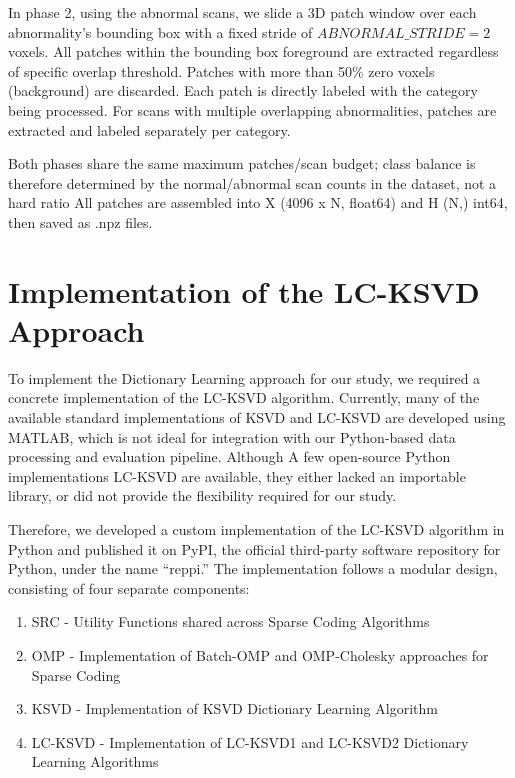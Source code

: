 In phase 2, using the abnormal scans, we slide a 3D patch window over each abnormality's bounding box with a fixed stride of 
\(ABNORMAL\_STRIDE = 2\) voxels. All patches within the bounding box foreground are extracted regardless of specific overlap 
threshold. Patches with more than 50\% zero voxels (background) are discarded. Each patch is directly labeled with the category 
being processed. For scans with multiple overlapping abnormalities, patches are extracted and labeled separately per category.

Both phases share the same maximum patches/scan budget; class balance is therefore determined by the normal/abnormal scan counts in the dataset, not a hard ratio
All patches are assembled into X (4096 x N, float64) and H (N,) int64, then saved as .npz files.


\section{Implementation of the LC-KSVD Approach}
To implement the Dictionary Learning approach for our study, we required a concrete implementation of the LC-KSVD algorithm. \cite{jiang2013lcksvd}
Currently, many of the available standard implementations of KSVD and LC-KSVD are developed using MATLAB, which is not ideal
for integration with our Python-based data processing and evaluation pipeline. Although A few open-source Python implementations
LC-KSVD are available, they either lacked an importable library, or did not provide the flexibility required for our study.

Therefore, we developed a custom implementation of the LC-KSVD algorithm in Python and published it on PyPI,
the official third-party software repository for Python, under the name “reppi.”
The implementation follows a modular design, consisting of four separate components:
\begin{enumerate}
    \item SRC - Utility Functions shared across Sparse Coding Algorithms
    \item OMP - Implementation of Batch-OMP and OMP-Cholesky approaches for Sparse Coding
    \item KSVD - Implementation of KSVD Dictionary Learning Algorithm
    \item LC-KSVD - Implementation of LC-KSVD1 and LC-KSVD2 Dictionary Learning Algorithms
\end{enumerate}

